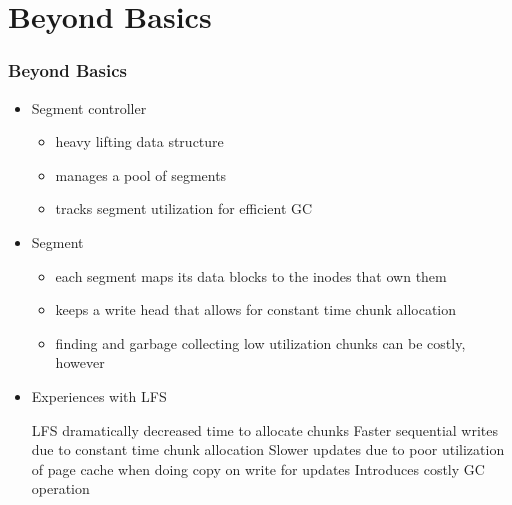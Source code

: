\section{Beyond Basics}

\begin{frame}
	\frametitle{Beyond Basics}
	\begin{itemize}[<+->]
		\setlength\itemsep{1em}
		\item Segment controller
			\begin{itemize}
				\item heavy lifting data structure
				\item manages a pool of segments 
				\item tracks segment utilization for efficient GC
			\end{itemize}
		\item Segment
			\begin{itemize}
				\item each segment maps its data blocks to the inodes that own them 
				\item keeps a write head that allows for constant time chunk allocation
				\item finding and garbage collecting low utilization chunks can be costly, however
			\end{itemize}
		\item Experiences with LFS
			\begin{itemize}
				\pro LFS dramatically decreased time to allocate chunks
			  \pro Faster sequential writes due to constant time chunk allocation
				\con Slower updates due to poor utilization of page cache when doing copy on write for updates
				\con Introduces costly GC operation
			\end{itemize}
	\end{itemize}
\end{frame}
